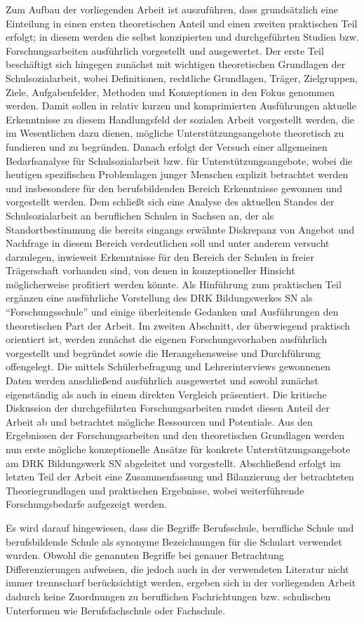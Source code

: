 Zum Aufbau der vorliegenden Arbeit ist auszuführen, dass grundsätzlich eine Einteilung in einen ersten theoretischen Anteil und einen zweiten praktischen Teil erfolgt; in diesem werden die selbst konzipierten und durchgeführten Studien bzw. Forschungsarbeiten ausführlich vorgestellt und ausgewertet. Der erste Teil beschäftigt sich hingegen zunächst mit wichtigen theoretischen Grundlagen der Schulsozialarbeit, wobei Definitionen, rechtliche Grundlagen, Träger, Zielgruppen, Ziele, Aufgabenfelder, Methoden und Konzeptionen in den Fokus genommen werden. Damit sollen in relativ kurzen und komprimierten Ausführungen aktuelle Erkenntnisse zu diesem Handlungsfeld der sozialen Arbeit vorgestellt werden, die im Wesentlichen dazu dienen, mögliche Unterstützungsangebote theoretisch zu fundieren und zu begründen. Danach erfolgt der Versuch einer allgemeinen Bedarfsanalyse für Schulsozialarbeit bzw. für Unterstützungsangebote, wobei die heutigen spezifischen Problemlagen junger Menschen explizit betrachtet werden und insbesondere für den berufsbildenden Bereich Erkenntnisse gewonnen und vorgestellt werden. Dem schließt sich eine Analyse des aktuellen Standes der Schulsozialarbeit an beruflichen Schulen in Sachsen an, der als Standortbestimmung die bereits eingangs erwähnte Diskrepanz von Angebot und Nachfrage in diesem Bereich verdeutlichen soll und unter anderem versucht darzulegen, inwieweit Erkenntnisse für den Bereich der Schulen in freier Trägerschaft vorhanden sind, von denen in konzeptioneller Hinsicht möglicherweise profitiert werden könnte. Als Hinführung zum praktischen Teil ergänzen eine ausführliche Vorstellung des DRK Bildungswerkes SN als "`Forschungsschule"' und einige überleitende Gedanken und Ausführungen den theoretischen Part der Arbeit. Im zweiten Abschnitt, der überwiegend praktisch orientiert ist, werden zunächst die eigenen Forschungsvorhaben ausführlich vorgestellt und begründet sowie die Herangehensweise und Durchführung offengelegt. Die mittels Schülerbefragung und Lehrerinterviews gewonnenen Daten werden anschließend ausführlich ausgewertet und sowohl zunächst eigenständig als auch in einem direkten Vergleich präsentiert. Die kritische Diskussion der durchgeführten Forschungsarbeiten rundet diesen Anteil der Arbeit ab und betrachtet mögliche Ressourcen und Potentiale. Aus den Ergebnissen der Forschungsarbeiten und den theoretischen Grundlagen werden nun erste mögliche konzeptionelle Ansätze für konkrete Unterstützungsangebote am DRK Bildungswerk SN abgeleitet und vorgestellt. Abschließend erfolgt im letzten Teil der Arbeit eine Zusammenfassung und Bilanzierung der betrachteten Theoriegrundlagen und praktischen Ergebnisse, wobei weiterführende Forschungsbedarfe aufgezeigt werden. 

Es wird darauf hingewiesen, dass die Begriffe Berufsschule, berufliche Schule und berufsbildende Schule als synonyme Bezeichnungen für die Schulart verwendet wurden. Obwohl die genannten Begriffe bei genauer Betrachtung Differenzierungen aufweisen, die jedoch auch in der verwendeten Literatur nicht immer trennscharf berücksichtigt werden, ergeben sich in der vorliegenden Arbeit dadurch keine Zuordnungen zu beruflichen Fachrichtungen bzw. schulischen Unterformen wie Berufsfachschule oder Fachschule.
